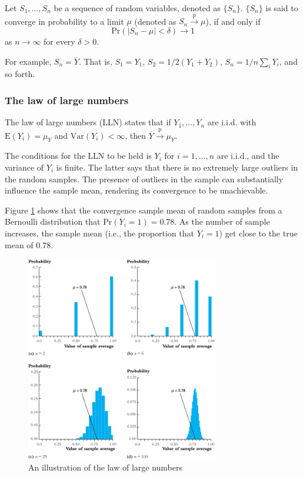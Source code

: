 \documentclass[a4paper,11pt]{article}
\begin{document}
Let \(S_1, \ldots, S_n\) be a sequence of random variables,
denoted as \(\{S_n\}\). \(\{S_n\}\) is said to converge in probability to a
limit \(\mu\) (denoted as \(S_n \xrightarrow{\text{p}} \mu\)), if and only if
\[ \mathrm{Pr} \left(|S_n-\mu| < \delta \right) \rightarrow 1 \]
as \(n \rightarrow \infty\) for every \(\delta > 0\).

For example, \(S_n = \overline{Y}\). That is, \(S_1=Y_1\), \(S_2=1/2(Y_1+Y_2)\),
\(S_n=1/n\sum_i Y_i\), and so forth.

\subsubsection*{The law of large numbers}
\label{sec:orgd6e7b58}

The law of large numbers (LLN) states that if \(Y_1, \ldots, Y_n\) are i.i.d. with
\(\mathrm{E}(Y_i)=\mu_Y\) and \(\mathrm{Var}(Y_i) < \infty\), then
\(\overline{Y} \xrightarrow{\text{p}} \mu_Y\). 

The conditions for the LLN to be held is \(Y_i\) for \(i=1, \ldots, n\)
are i.i.d., and the variance of \(Y_i\) is finite. The latter says that
there is no extremely large outliers in the random samples. The
presence of outliers in the sample can substantially influence the
sample mean, rendering its convergence to be unachievable. 

Figure \ref{fig:orge5a3196} shows that the convergence sample mean of random
samples from a Bernoulli distribution that \(\mathrm{Pr}(Y_i = 1) =
0.78\). As the number of sample increases, the sample mean (i.e., the
proportion that \(Y_i = 1\)) get close to the true mean of 0.78. 

\begin{figure}[htbp]
\centering
\includegraphics[width=0.75\textwidth]{figure/fig-2-8.png}
\caption{\label{fig:orge5a3196}
An illustration of the law of large numbers}
\end{figure}
\end{document}

